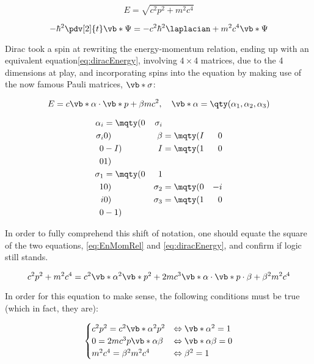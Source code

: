  \begin{equation}
    E=\sqrt{c^2p^2+m^2c^4}
    \label{eq:EnMomRel}
 \end{equation}

 \begin{equation}
    -\hbar^2 \pdv[2]{t} \vb*{\Psi}=-c^2\hbar^2\laplacian + m^2c^4\vb*{\Psi}
    \label{eq:KG}
\end{equation}

 Dirac took a spin at rewriting the energy-momentum relation, ending up with an equivalent equation\eqref{eq:diracEnergy}, involving $4\times 4$ matrices, due to the 4 dimensions at play, and incorporating spins into the equation by making use of the now famous Pauli matrices, $\vb*{\sigma}$:

 \begin{equation}
    E=c\vb*{\alpha}\cdot \vb*{p}+{\beta} mc^2,\quad \vb*{\alpha}=\qty(\alpha_1,\alpha_2,\alpha_3)
    \label{eq:diracEnergy}
 \end{equation}

 \begin{align}
    \alpha_i&=\mqty(0 & {\sigma}_i\\ {\sigma}_i&0) & {\beta}&=\mqty(I & 0 \\ 0 &-I) &I&=\mqty(1&0\\0&1)\\
    \sigma_1&=\mqty(0&1\\1&0) & \sigma_2&=\mqty(0&-i\\i&0)& \sigma_3&=\mqty(1&0\\0&-1)
 \end{align}

 In order to fully comprehend this shift of notation, one should equate the square of the two equations, \eqref{eq:EnMomRel} and \eqref{eq:diracEnergy}, and confirm if logic still stands.

 \begin{equation}
    c^2 p^2 + m^2c^4 = c^2\vb*{\alpha}^2\vb*{p}^2+2 m c^3 \vb*{\alpha}\cdot \vb*{p} \cdot \beta + \beta^2 m^2 c^4
 \end{equation}

 In order for this equation to make sense, the following conditions must be true (which in fact, they are):

\begin{gather}
    \begin{cases}
        c^2p^2=c^2\vb*{\alpha}^2 p^2  &\Leftrightarrow \vb*{\alpha}^2=1\\
        0=2mc^3  p \vb*{\alpha} \beta &\Leftrightarrow \vb*{\alpha} \beta =0\\
        m^2c^4=\beta^2 m^2c^4     &\Leftrightarrow \beta^2 =1
    \end{cases}
\end{gather}


